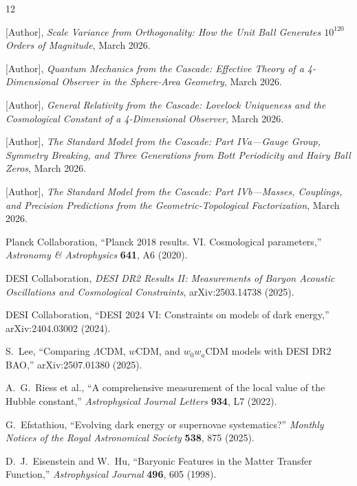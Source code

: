 \documentclass[12pt,a4paper]{article}
\begin{document}
\begin{thebibliography}{12}

 {[Author]}, \textit{Scale Variance from Orthogonality: How the Unit Ball
Generates $10^{120}$ Orders of Magnitude}, March 2026.

 {[Author]}, \textit{Quantum Mechanics from the Cascade: Effective Theory of
a 4-Dimensional Observer in the Sphere-Area Geometry}, March 2026.

 {[Author]}, \textit{General Relativity from the Cascade: Lovelock Uniqueness
and the Cosmological Constant of a 4-Dimensional Observer}, March 2026.

 {[Author]}, \textit{The Standard Model from the Cascade: Part IVa---Gauge
Group, Symmetry Breaking, and Three Generations from Bott Periodicity and Hairy Ball
Zeros}, March 2026.

 {[Author]}, \textit{The Standard Model from the Cascade: Part IVb---Masses,
Couplings, and Precision Predictions from the Geometric-Topological Factorization},
March 2026.

 Planck Collaboration, ``Planck 2018 results. VI. Cosmological parameters,''
\textit{Astronomy \& Astrophysics} \textbf{641}, A6 (2020).

 DESI Collaboration, \textit{DESI DR2 Results II: Measurements of Baryon
Acoustic Oscillations and Cosmological Constraints}, arXiv:2503.14738 (2025).

 DESI Collaboration, ``DESI 2024 VI: Constraints on models of dark energy,''
arXiv:2404.03002 (2024).

 S.~Lee, ``Comparing $\Lambda$CDM, $w$CDM, and $w_0w_a$CDM models with DESI DR2
BAO,'' arXiv:2507.01380 (2025).

 A.~G.~Riess et al., ``A comprehensive measurement of the local value of the
Hubble constant,'' \textit{Astrophysical Journal Letters} \textbf{934}, L7 (2022).

 G.~Efstathiou, ``Evolving dark energy or supernovae systematics?''
\textit{Monthly Notices of the Royal Astronomical Society} \textbf{538}, 875 (2025).

 D.~J.~Eisenstein and W.~Hu, ``Baryonic Features in the Matter Transfer
Function,'' \textit{Astrophysical Journal} \textbf{496}, 605 (1998).

\end{thebibliography}
\end{document}
